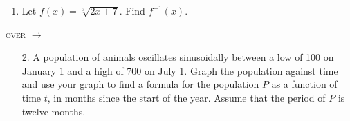 \documentclass[11pt]{article}
\begin{document}
\pagestyle{empty}
\newsavebox{\quizfront}
\begin{lrbox}{\quizfront}
\begin{minipage}[top][4.5in][t]{\textwidth} \setlength{\parindent}{1.5em}
\drawtitle
\vspace{-0.5in}
\begin{enumerate}

\item Let $f(x) = \sqrt[3]{2x+7}$.  Find $f^{-1}(x)$.

  \vfill

\end{enumerate}

\hfill \textsc{over} $\longrightarrow$




\end{minipage}
\end{lrbox}

\newsavebox{\quizback}
\begin{lrbox}{\quizback}
\begin{minipage}[top][4.5in][t]{\textwidth} \setlength{\parindent}{1.5em}
\begin{itemize}
\item[2.] A population of animals oscillates sinusoidally between a low of 100 on January 1 and a high of 700 on July 1. Graph the population against time and use your graph to find a formula for the population $P$ as a function of time $t$, in months since the start of the year. Assume that the period of $P$ is twelve months. 


\end{itemize}
\end{minipage}
\end{lrbox}

\noindent \usebox{\quizfront}
\vfill
\noindent \usebox{\quizfront}

\pagebreak
\noindent \usebox{\quizback}
\vfill
\noindent \usebox{\quizback}
\end{document}
